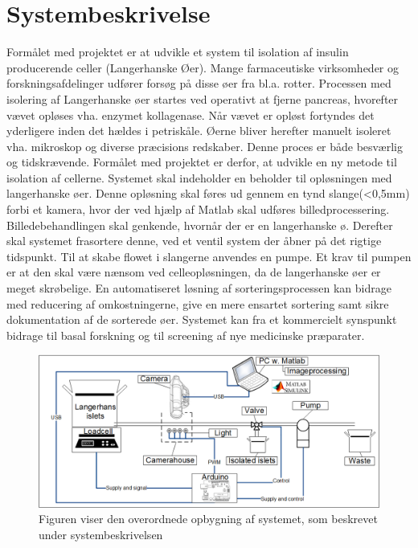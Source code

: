\section{Systembeskrivelse}
Formålet med projektet er at udvikle et system til isolation af insulin producerende celler (Langerhanske Øer). Mange farmaceutiske virksomheder og forskningsafdelinger udfører forsøg på disse øer fra bl.a. rotter. Processen med isolering af Langerhanske øer startes ved operativt at fjerne pancreas, hvorefter vævet opløses vha. enzymet kollagenase. Når vævet er opløst fortyndes det yderligere inden det hældes i petriskåle. Øerne bliver herefter manuelt isoleret vha. mikroskop og diverse præcisions redskaber. Denne proces er både besværlig og tidskrævende. Formålet med projektet er derfor, at udvikle en ny metode til isolation af cellerne. Systemet skal indeholder en beholder til opløsningen med langerhanske øer. Denne opløsning skal føres ud gennem en tynd slange(<0,5mm)  forbi et kamera, hvor der ved hjælp af Matlab skal udføres billedprocessering. Billedebehandlingen skal genkende, hvornår der er en langerhanske ø. Derefter skal systemet frasortere denne, ved et ventil system der åbner på det rigtige tidspunkt. Til at skabe flowet i slangerne anvendes en pumpe.  Et krav til pumpen er at den skal være nænsom ved celleopløsningen, da de langerhanske øer er meget skrøbelige.
En automatiseret løsning af sorteringsprocessen kan bidrage med reducering af omkostningerne, give en mere ensartet sortering samt sikre dokumentation af de sorterede øer. Systemet kan fra et kommercielt synspunkt bidrage til basal forskning og til screening af nye medicinske præparater.

\begin{figure}[H]
	\centering
	\includegraphics[width=1\textwidth]{billeder/Overview.png}
	\caption{Figuren viser den overordnede opbygning af systemet, som beskrevet under systembeskrivelsen}
	\label{fig:usecase}
\end{figure}

